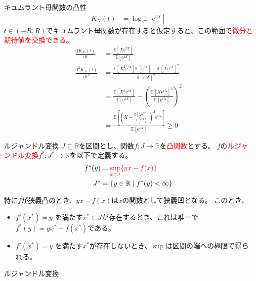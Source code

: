 \documentclass[lualatex,handout]{beamer}
\newcommand{\emm}[1]{\textcolor{red}{#1}}
\newcommand{\expt}[1]{\mathbb{E}\left[#1\right]}
\theoremstyle{definition}
\begin{document}
\begin{frame}{キュムラント母関数の凸性}
\begin{align*}
K_X(t) &= \log \expt{\mathrm{e}^{tX}}
\end{align*}
$t\in(-R, R)$でキュムラント母関数が存在すると仮定すると、この範囲で\emm{微分と期待値を交換できる}。
\begin{align*}
\frac{\mathrm{d} K_X(t)}{\mathrm{d}t} &= \frac{\expt{X\mathrm{e}^{tX}}}{\expt{\mathrm{e}^{tX}}}\\
\frac{\mathrm{d}^2 K_X(t)}{\mathrm{d}t^2} &= \frac{\expt{X^2\mathrm{e}^{tX}}\expt{\mathrm{e}^{tX}}-\expt{X\mathrm{e}^{tX}}^2}{\expt{\mathrm{e}^{tX}}^2}\\
&= \frac{\expt{X^2\mathrm{e}^{tX}}}{\expt{\mathrm{e}^{tX}}}-\left(\frac{\expt{X\mathrm{e}^{tX}}^2}{\expt{\mathrm{e}^{tX}}}\right)^2\\
&= \frac{\expt{\left(X-\frac{\expt{X\mathrm{e}^{tX}}}{\expt{\mathrm{e}^{tX}}}\right)^2\mathrm{e}^{tX}}}{\expt{\mathrm{e}^{tX}}}\ge 0
\end{align*}
\end{frame}

\begin{frame}{ルジャンドル変換}
$J\subseteq\mathbb{R}$を区間とし、関数$f\colon J\to\mathbb{R}$を\emm{凸関数}とする。
$f$の\emm{ルジャンドル変換}$f^*\colon J^*\to\mathbb{R}$を以下で定義する。
\begin{align*}
f^*(y) &= \emm{\sup_{x\in J}\{yx - f(x)\}}\\
J^*&=\{y\in\mathbb{R}\mid f^*(y)<\infty\}
\end{align*}

\vspace{1em}
特に$f$が狭義凸のとき、$yx-f(x)$は$x$の関数として狭義凹となる。
このとき、
\begin{itemize}
\setlength{\itemsep}{1em}
\item $f'(x^*) = y$ を満たす$x^*\in J$が存在するとき、これは唯一で$f^*(y) = yx^* - f(x^*)$である。
\item $f'(x^*) = y$ を満たす$x^*$が存在しないとき、$\sup$は区間の端への極限で得られる。
\end{itemize}
\end{frame}

\begin{frame}{ルジャンドル変換}
\centering
{}
\end{frame}
\end{document}
